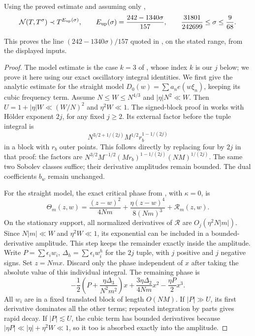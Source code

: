 \begin{proposition}\label{prop:upperthree}
Using the proved estimate \cite[(\ref*{six-eq:baseatkinson})]{Weighted} and assuming only
\cite[(\ref*{six-eq:basefourth})]{Weighted},
\[
 \mathcal{N}(T,T^\sigma)\prec T^{E_{\mathrm{up}}(\sigma)},\qquad
 E_{\mathrm{up}}(\sigma)=\frac{242-1340\sigma}{157},\qquad
 \frac{31801}{242699}\le\sigma\le\frac9{68}.
\]
\end{proposition}
This proves the line $(242-1340\sigma)/157$ quoted in
\cite[Section 1]{Thin}, on the stated range, from the displayed inputs.
\begin{proof}
The model estimate is the case $k=3$ of \cite[Theorem 5.1]{dFP}, whose
index $k$ is our $j$ below;
we prove it here using our exact oscillatory integral identities.
We first give the analytic estimate for the straight model
$D_0(w)=\sum a_ne(w\xi_n)$, keeping its cubic frequency term.
Assume $N\le W\le N^{4/3}$ and $|\eta|N^2\ll W$.
Then $U=1+|\eta|W\ll(W/N)^2$ and $\eta^2W\ll1$.
The signed-block proof in \cite[Appendix~\ref*{six-app:dualityproof}]{Weighted} works with
H\"older exponent $2j$, for any fixed $j\ge2$. Its external factor
before the tuple integral is
\[
 N^{3/2+1/(2j)}M^{1/2}r_b^{1-1/(2j)}
\]
in a block with $r_b$ outer points. This follows directly by replacing
four by $2j$ in that proof: the factors are
$N^{3/2}M^{-1/2}(Mr_b)^{1-1/(2j)}(NM)^{1/(2j)}$.
The same two Sobolev classes suffice; their derivative amplitudes
remain bounded. The dual coefficients $b_w$ remain unchanged.

For the straight model, the exact critical phase from
\cite[Proposition~\ref*{six-prop:exactphaseproof}]{Weighted}, with $\kappa=0$, is
\[
 \Theta_m(z,w)=\frac{(z-w)^2}{4Nm}
          +\frac{\eta(z-w)^4}{8(Nm)^3}+\mathcal R_m(z,w).
\]
On the stationary support, all normalized derivatives of $\mathcal R$
are $O_j(\eta^2N|m|)$. Since $N|m|\ll W$ and $\eta^2W\ll1$,
its exponential can be included in a bounded-derivative amplitude.
This step keeps the remainder exactly inside the amplitude.
Write $P=\sum\epsilon_iw_i$, $\Delta_h=\sum\epsilon_iw_i^h$ for
the $2j$ tuple, with $j$ positive and $j$ negative signs.
Set $z=Nmx$. Discard only the phase independent of $x$ after taking
the absolute value of this individual integral. The remaining phase is
\[
 -\frac12\left(P+\frac{\eta\Delta_3}{N^2m^2}\right)x
       +\frac{3\eta\Delta_2}{4Nm}x^2-\frac{\eta P}{2}x^3.
\]
All $w_i$ are in a fixed translated block of length $O(NM)$.
If $|P|\gg U$, its first derivative dominates all the other terms;
repeated integration by parts gives rapid decay. If $|P|\lesssim U$,
the cubic term has bounded derivatives because
$|\eta P|\ll|\eta|+\eta^2W\ll1$, so it too is absorbed exactly
into the amplitude.


\end{proof}
